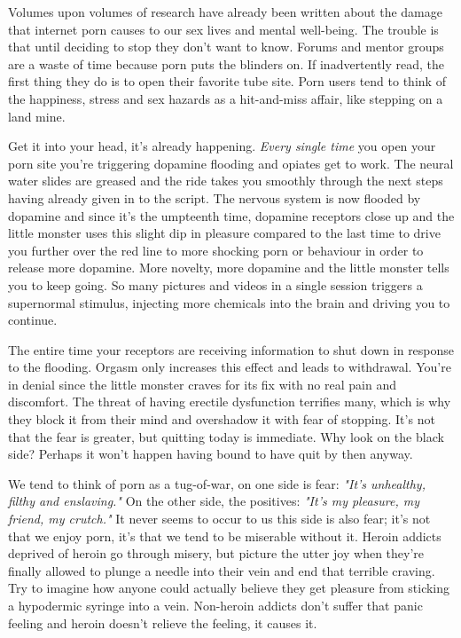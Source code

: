 \documentclass[easypeasy.tex]{subfiles}
\begin{document}
Volumes upon volumes of research have already been written about the damage that internet porn causes to our sex lives and mental well-being. The trouble is that until deciding to stop they don't want to know. Forums and mentor groups are a waste of time because porn puts the blinders on. If inadvertently read, the first thing they do is to open their favorite tube site. Porn users tend to think of the happiness, stress and sex hazards as a hit-and-miss affair, like stepping on a land mine.

Get it into your head, it's already happening. \textit{Every single time} you open your porn site you're triggering dopamine flooding and opiates get to work. The neural water slides are greased and the ride takes you smoothly through the next steps having already given in to the script. The nervous system is now flooded by dopamine and since it's the umpteenth time, dopamine receptors close up and the little monster uses this slight dip in pleasure compared to the last time to drive you further over the red line to more shocking porn or behaviour in order to release more dopamine. More novelty, more dopamine and the little monster tells you to keep going. So many pictures and videos in a single session triggers a supernormal stimulus, injecting more chemicals into the brain and driving you to continue.

The entire time your receptors are receiving information to shut down in response to the flooding. Orgasm only increases this effect and leads to withdrawal. You're in denial since the little monster craves for its fix with no real pain and discomfort. The threat of having erectile dysfunction terrifies many, which is why they block it from their mind and overshadow it with fear of stopping. It's not that the fear is greater, but quitting today is immediate. Why look on the black side? Perhaps it won't happen having bound to have quit by then anyway.

We tend to think of porn as a tug-of-war, on one side is fear: \textit{"It's unhealthy, filthy and enslaving."} On the other side, the positives: \textit{"It's my pleasure, my friend, my crutch."} It never seems to occur to us this side is also fear; it's not that we enjoy porn, it's that we tend to be miserable without it. Heroin addicts deprived of heroin go through misery, but picture the utter joy when they're finally allowed to plunge a needle into their vein and end that terrible craving. Try to imagine how anyone could actually believe they get pleasure from sticking a hypodermic syringe into a vein. Non-heroin addicts don't suffer that panic feeling and heroin doesn't relieve the feeling, it causes it.
\end{document}
